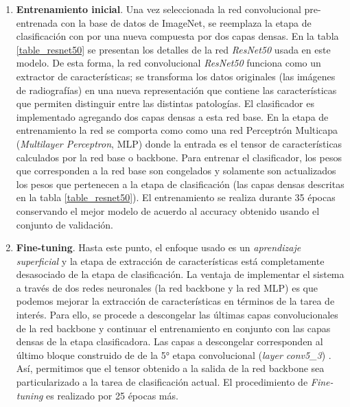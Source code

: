 {%
\begin{enumerate}
    \item \textbf{Entrenamiento inicial}. Una vez seleccionada la red convolucional pre-entrenada
          con la base de datos de ImageNet, se reemplaza la etapa de clasificación con por una nueva
          compuesta por dos capas densas. En la tabla \ref{table_resnet50} se presentan los detalles
          de la red \textit{ResNet50} usada en este modelo. De esta forma, la red convolucional
          \textit{ResNet50} funciona como un extractor de características; se transforma los datos
          originales (las imágenes de radiografías) en una nueva representación que contiene las
          características que permiten distinguir entre las distintas patologías. El clasificador es
          implementado agregando dos capas densas a esta red base. En la etapa de entrenamiento la
          red se comporta como como una red Perceptrón Multicapa (\textit{Multilayer Perceptron},
          MLP) donde la entrada es el tensor de características calculados por la red base o
          backbone. Para entrenar el clasificador, los pesos que corresponden a la red base son
          congelados y solamente son actualizados los pesos que pertenecen a la etapa de
          clasificación (las capas densas descritas en la tabla \ref{table_resnet50}). El
          entrenamiento se realiza durante 35 épocas conservando el mejor modelo de acuerdo al
          accuracy obtenido usando el conjunto de validación.

    \item \textbf{Fine-tuning}. Hasta este punto, el enfoque usado es un \textit{aprendizaje superficial}
          y la etapa de extracción de características está completamente desasociado de la etapa de
          clasificación. La ventaja de implementar el sistema a través de dos redes neuronales (la
          red backbone y la red MLP) es que podemos mejorar la extracción de características en
          términos de la tarea de interés. Para ello, se procede a descongelar las últimas capas
          convolucionales de la red backbone y continuar el entrenamiento en conjunto con las capas
          densas de la etapa clasificadora. Las capas a descongelar corresponden al último bloque
          construido de de la 5° etapa convolucional (\textit{layer conv5\_3}) \cite{he2016deep}.
          Así, permitimos que el tensor obtenido a la salida de la red backbone sea particularizado
          a la tarea de clasificación actual. El procedimiento de \textit{Fine-tuning} es realizado
          por 25 épocas más.


\end{enumerate}}
